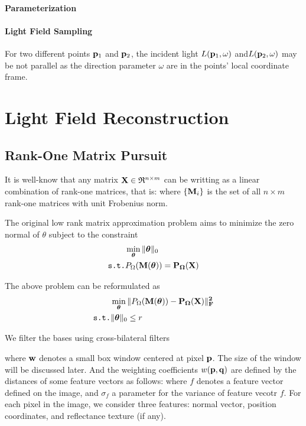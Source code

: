 \documentclass[review]{acmsiggraph}
\begin{document}
\paragraph{Parameterization}


\paragraph{Light Field Sampling}
For two different points ${\bf p}_1$ and ${\bf p}_2$, the incident light $L({\bf p}_1,\omega)$ and$L({\bf p}_2,\omega)$ may be not parallel as the direction parameter $\omega$ are in the points' local coordinate frame.

\section{Light Field Reconstruction}

\subsection{Rank-One Matrix Pursuit}

It is well-know that any matrix ${\bf X}\in\mathfrak{R}^{n\times m}$ can be writting as a linear combination of rank-one matrices, that is:
where $\{ {\bf M}_i\}$ is the set of all $n\times m$ rank-one matrices with unit Frobenius norm.

The original low rank matrix approximation problem aims to minimize the zero normal of $\theta$ subject to the constraint
\begin{eqnarray}
	& \min_{\boldsymbol\theta} \|\boldsymbol\theta\|_0 \\
	\texttt{s.t.} & P_\Omega(\bf M(\boldsymbol\theta)) = P_\Omega(\bf X)
\end{eqnarray}

The above problem can be reformulated as 
\begin{eqnarray}
	& \min_{\boldsymbol\theta} \|P_\Omega(\bf M(\boldsymbol\theta)) - P_\Omega(\bf X) \|_F^2 \\
	\texttt{s.t.} & \|\boldsymbol\theta\|_0\leq r 
\end{eqnarray}

We filter the bases using cross-bilateral filters

where $\bf w$ denotes a small box window centered at pixel ${\bf p}$. The size of the window will be discussed later.  And the weighting coefficients $w({\bf p},{\bf q})$ are defined by the distances of some feature vectors as follows:
where $f$ denotes a feature vector defined on the image, and $\sigma_f$ a parameter for the variance of feature vecotr $f$. For each pixel in the image, we consider three features: normal vector, position coordinates, and reflectance texture (if any). 
\end{document}
